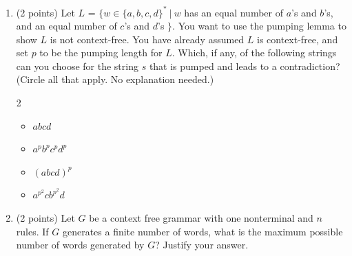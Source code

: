 \documentclass[11pt]{article}
\begin{document}
\begin{enumerate}
\begin{enumerate}
\begin{answer}
\end{answer}

\item (2 points) Let $L$ = $\{w \in \{a,b,c,d\}^* \ |\ w$ has an equal number of $a$'s and $b$'s, and an equal number of $c$'s and $d$'s $\}$. You want to use the pumping lemma to show $L$ is not context-free. You have already assumed $L$ is context-free, and set $p$ to be the pumping length for $L$. Which, if any, of the following strings can you choose for the string $s$ that is pumped and leads to a contradiction? (Circle all that apply. No explanation needed.)

\begin{multicols}{2}
\begin{itemize}
    \item $abcd$
    \item $a^pb^pc^pd^p$
    \item $(abcd)^p$
    \item $a^{p^2}cb^{p^2}d$
\end{itemize}
\end{multicols}

\begin{answer}

\end{answer}

\item (2 points) Let $G$ be a context free grammar with one nonterminal and $n$ rules. If $G$ generates a finite number of words, what is the maximum possible number of words generated by $G$? Justify your answer.

\begin{answer}
\end{answer}

\end{enumerate}


\end{enumerate}
\end{document}
